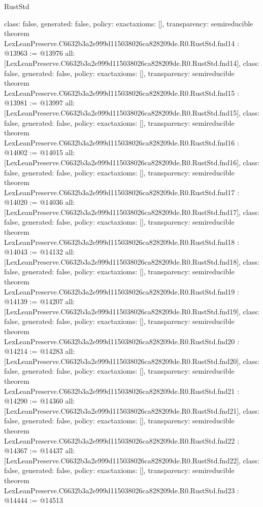 \begin{lexlean}{RustStd}
\begin{coremodule}
{  class: false,
  generated: false,
  policy: exact{axioms: []},
  transparency: semireducible
}
theorem LexLeanPreserve.C6632b3a2e999d115038026ca828209de.R0.RustStd.fnd14 : @13963 := @13976 {
  all: [LexLeanPreserve.C6632b3a2e999d115038026ca828209de.R0.RustStd.fnd14],
  class: false,
  generated: false,
  policy: exact{axioms: []},
  transparency: semireducible
}
theorem LexLeanPreserve.C6632b3a2e999d115038026ca828209de.R0.RustStd.fnd15 : @13981 := @13997 {
  all: [LexLeanPreserve.C6632b3a2e999d115038026ca828209de.R0.RustStd.fnd15],
  class: false,
  generated: false,
  policy: exact{axioms: []},
  transparency: semireducible
}
theorem LexLeanPreserve.C6632b3a2e999d115038026ca828209de.R0.RustStd.fnd16 : @14002 := @14015 {
  all: [LexLeanPreserve.C6632b3a2e999d115038026ca828209de.R0.RustStd.fnd16],
  class: false,
  generated: false,
  policy: exact{axioms: []},
  transparency: semireducible
}
theorem LexLeanPreserve.C6632b3a2e999d115038026ca828209de.R0.RustStd.fnd17 : @14020 := @14036 {
  all: [LexLeanPreserve.C6632b3a2e999d115038026ca828209de.R0.RustStd.fnd17],
  class: false,
  generated: false,
  policy: exact{axioms: []},
  transparency: semireducible
}
theorem LexLeanPreserve.C6632b3a2e999d115038026ca828209de.R0.RustStd.fnd18 : @14043 := @14132 {
  all: [LexLeanPreserve.C6632b3a2e999d115038026ca828209de.R0.RustStd.fnd18],
  class: false,
  generated: false,
  policy: exact{axioms: []},
  transparency: semireducible
}
theorem LexLeanPreserve.C6632b3a2e999d115038026ca828209de.R0.RustStd.fnd19 : @14139 := @14207 {
  all: [LexLeanPreserve.C6632b3a2e999d115038026ca828209de.R0.RustStd.fnd19],
  class: false,
  generated: false,
  policy: exact{axioms: []},
  transparency: semireducible
}
theorem LexLeanPreserve.C6632b3a2e999d115038026ca828209de.R0.RustStd.fnd20 : @14214 := @14283 {
  all: [LexLeanPreserve.C6632b3a2e999d115038026ca828209de.R0.RustStd.fnd20],
  class: false,
  generated: false,
  policy: exact{axioms: []},
  transparency: semireducible
}
theorem LexLeanPreserve.C6632b3a2e999d115038026ca828209de.R0.RustStd.fnd21 : @14290 := @14360 {
  all: [LexLeanPreserve.C6632b3a2e999d115038026ca828209de.R0.RustStd.fnd21],
  class: false,
  generated: false,
  policy: exact{axioms: []},
  transparency: semireducible
}
theorem LexLeanPreserve.C6632b3a2e999d115038026ca828209de.R0.RustStd.fnd22 : @14367 := @14437 {
  all: [LexLeanPreserve.C6632b3a2e999d115038026ca828209de.R0.RustStd.fnd22],
  class: false,
  generated: false,
  policy: exact{axioms: []},
  transparency: semireducible
}
theorem LexLeanPreserve.C6632b3a2e999d115038026ca828209de.R0.RustStd.fnd23 : @14444 := @14513 {
}
\end{coremodule}
\end{lexlean}
